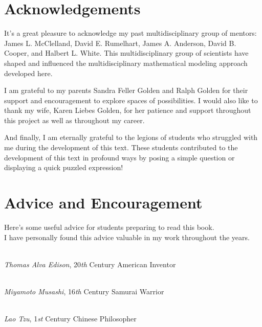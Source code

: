 \section*{Acknowledgements}
It's a great pleasure to acknowledge my past multidisciplinary group of mentors:
James L. McClelland, David E. Rumelhart,
James A. Anderson, 
David B. Cooper, and Halbert L. White.
This multidisciplinary group of scientists have shaped and influenced the 
multidisciplinary mathematical modeling approach developed here.

I am grateful to my parents Sandra Feller Golden and Ralph Golden for their support
and encouragement to explore spaces of possibilities.
I would also like to thank my wife, Karen Liebes Golden, for her patience and support throughout this project
as well as throughout my career.

And finally, I am eternally grateful to the legions of students who struggled with me during the development
of this text. These students contributed to the development of this text in profound ways
by posing a simple question or displaying a quick puzzled expression! 

\section*{Advice and Encouragement}

Here's some useful advice for students preparing to read this book. \\
I have personally found this
advice valuable in my work throughout the years.
\begin{itemize}

\begin{item}
 \\
{\em Thomas Alva Edison}, 20{\em th} Century American Inventor
\\
\end{item}
\begin{item}
 \\
{\em Miyamoto Musashi}, 16{\em th} Century Samurai Warrior
\\
\end{item}
 \begin{item}
 \\
{\em Lao Tzu}, 1{\em st} Century Chinese Philosopher
\end{item}
\end{itemize}

